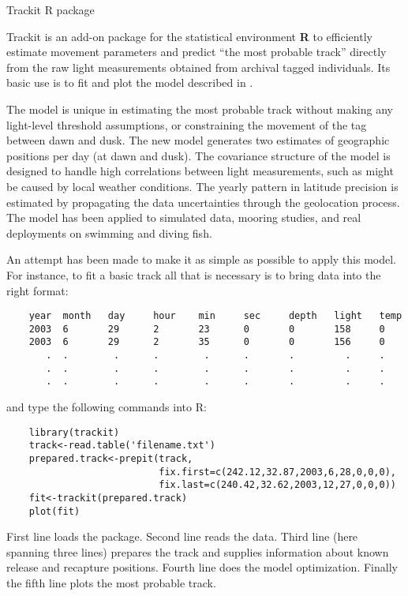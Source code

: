 \documentclass[11pt]{article}
\begin{document}
\begin{center}
{\huge Trackit R package}
\end{center}
\Large
\thispagestyle{empty}
Trackit is an add-on package for the statistical environment {\bf R}
to efficiently estimate movement parameters and predict ``the most
probable track'' directly from the raw light measurements obtained
from archival tagged individuals. Its basic use is to fit and plot the
model described in .

The model is unique in estimating the most probable track without
making any light-level threshold assumptions, or constraining the
movement of the tag between dawn and dusk. The new model generates two
estimates of geographic positions per day (at dawn and dusk). The
covariance structure of the model is designed to handle high
correlations between light measurements, such as might be caused by
local weather conditions. The yearly pattern in latitude precision is
estimated by propagating the data uncertainties through the
geolocation process. The model has been applied to simulated data,
mooring studies, and real deployments on swimming and diving fish.

An attempt has been made to make it as simple as possible to apply 
this model. For instance, to fit a basic track all that is necessary 
is to bring data into the right format: 
\vspace{-0.6cm}
{\color{blue}
\begin{small}
\begin{verbatim}
    year  month   day     hour    min     sec     depth   light   temp
    2003  6       29      2       23      0       0       158     0
    2003  6       29      2       35      0       0       156     0
       .  .        .      .        .      .       .         .     .
       .  .        .      .        .      .       .         .     .
       .  .        .      .        .      .       .         .     .
\end{verbatim}
\end{small}}
and type the following commands into R: 
\vspace{-.3cm}
{\color{red}
\begin{small}
\begin{verbatim}
    library(trackit)
    track<-read.table('filename.txt')
    prepared.track<-prepit(track,
                           fix.first=c(242.12,32.87,2003,6,28,0,0,0),
                           fix.last=c(240.42,32.62,2003,12,27,0,0,0))
    fit<-trackit(prepared.track)
    plot(fit)
\end{verbatim}
\end{small}}
First line loads the package. Second line reads the data. Third 
line (here spanning three lines) prepares the track and supplies 
information about known release and recapture positions. Fourth line 
does the model optimization. Finally the fifth line plots the most 
probable track.     
\end{document}
